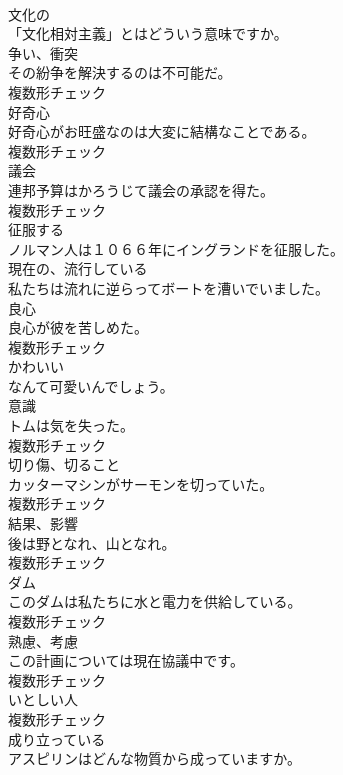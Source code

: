 \documentclass[8pt]{extreport}
\begin{document}
\begin{CJK}{UTF8}{min}
\\	[形容詞]	文化の	
\\	「文化相対主義」とはどういう意味ですか。	
\\	[名詞]	争い、衝突	
\\	その紛争を解決するのは不可能だ。	
\\	複数形チェック
\\	[名詞]	好奇心	
\\	好奇心がお旺盛なのは大変に結構なことである。	
\\	複数形チェック
\\	[名詞]	議会	
\\	連邦予算はかろうじて議会の承認を得た。	
\\	複数形チェック
\\	[動詞]	征服する	
\\	ノルマン人は１０６６年にイングランドを征服した。	
\\	[形容詞]	現在の、流行している	
\\	私たちは流れに逆らってボートを漕いでいました。	
\\	[名詞]	良心	
\\	良心が彼を苦しめた。	
\\	複数形チェック
\\	[形容詞]	かわいい	
\\	なんて可愛いんでしょう。	
\\	[名詞]	意識	
\\	トムは気を失った。	
\\	複数形チェック
\\	[名詞]	切り傷、切ること	
\\	カッターマシンがサーモンを切っていた。	
\\	複数形チェック
\\	[名詞]	結果、影響	
\\	後は野となれ、山となれ。	
\\	複数形チェック
\\	[名詞]	ダム	
\\	このダムは私たちに水と電力を供給している。	
\\	複数形チェック
\\	[名詞]	熟慮、考慮	
\\	この計画については現在協議中です。	
\\	複数形チェック
\\	[名詞]	いとしい人	
\\	複数形チェック
\\	[動詞]	成り立っている	
\\	アスピリンはどんな物質から成っていますか。	

\end{CJK}
\end{document}
